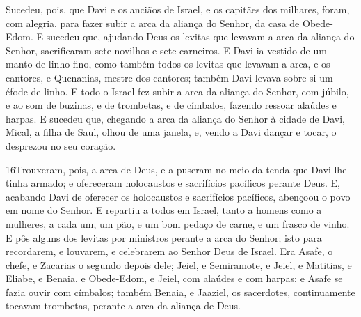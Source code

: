 Sucedeu, pois, que Davi e os anciãos de Israel, e os capitães dos
milhares, foram, com alegria, para fazer subir a arca da aliança do
Senhor, da casa de Obede-Edom. E sucedeu que, ajudando Deus
os levitas que levavam a arca da aliança do Senhor, sacrificaram
sete novilhos e sete carneiros. E Davi ia vestido de um manto
de linho fino, como também todos os levitas que levavam a arca, e os
cantores, e Quenanias, mestre dos cantores; também Davi levava sobre
si um éfode de linho. E todo o Israel fez subir a arca da
aliança do Senhor, com júbilo, e ao som de buzinas, e de trombetas,
e de címbalos, fazendo ressoar alaúdes e harpas. E sucedeu
que, chegando a arca da aliança do Senhor à cidade de Davi, Mical, a
filha de Saul, olhou de uma janela, e, vendo a Davi dançar e tocar,
o desprezou no seu coração.

\medskip

\lettrine{16} Trouxeram, pois, a arca de Deus, e a puseram no
meio da tenda que Davi lhe tinha armado; e ofereceram holocaustos e
sacrifícios pacíficos perante Deus. E, acabando Davi de oferecer
os holocaustos e sacrifícios pacíficos, abençoou o povo em nome do
Senhor. E repartiu a todos em Israel, tanto a homens como a
mulheres, a cada um, um pão, e um bom pedaço de carne, e um frasco
de vinho. E pôs alguns dos levitas por ministros perante a arca
do Senhor; isto para recordarem, e louvarem, e celebrarem ao Senhor
Deus de Israel. Era Asafe, o chefe, e Zacarias o segundo depois
dele; Jeiel, e Semiramote, e Jeiel, e Matitias, e Eliabe, e Benaia,
e Obede-Edom, e Jeiel, com alaúdes e com harpas; e Asafe se fazia
ouvir com címbalos; também Benaia, e Jaaziel, os sacerdotes,
continuamente tocavam trombetas, perante a arca da aliança de Deus.

